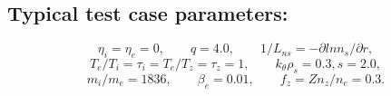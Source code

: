 \documentclass[a4paper,openany,12pt]{book}
\begin{document}
{\subsection*{Typical test case parameters:}
$$\eta_i=\eta_e=0,\qquad q=4.0,\qquad 1/L_{ns}=-\partial lnn_s/\partial r,$$
$$T_e/T_i=\tau_i=T_e/T_z=\tau_z=1,\qquad k_\theta\rho_s=0.3, s=2.0,$$
$$m_i/m_e=1836,\qquad \beta_e=0.01,\qquad f_z=Zn_z/n_e=0.3.$$

%
%
%
%
%
%
%
%
%
}
\end{document}
